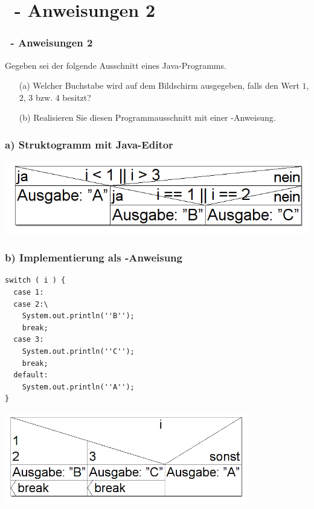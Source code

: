\def\stitle{\theexercise\ - Anweisungen 2}
\section{\stitle}
\begin{frame}[t]%
    \frametitle{\stitle}
\medskip

Gegeben sei der folgende Ausschnitt eines Java-Programms.


\begin{itemize}
\item[(a)] Welcher Buchstabe wird auf dem Bildschirm ausgegeben, falls  den Wert $1$, $2$, $3$ bzw. $4$ besitzt?
\item[(b)] Realisieren Sie diesen Programmausschnitt mit einer -Anweisung.
\end{itemize}
\end{frame}


\begin{frame}[fragile]%
 \frametitle{a) Struktogramm mit Java-Editor}%

\begin{center}

\includegraphics[width=1\textwidth]{anweis-2/Bilder/Struktogramm_a}
\end{center}
\end{frame}


\begin{frame}[fragile]%
 \frametitle{b) Implementierung als -Anweisung}%

\begin{center}
\begin{minipage}{0.7\textwidth}
\begin{lstlisting}
switch ( i ) {
  case 1:
  case 2:\
    System.out.println(''B'');
    break;
  case 3:
    System.out.println(''C'');
    break;
  default:
    System.out.println(''A'');
}
\end{lstlisting}

\end{minipage}
\medskip

\includegraphics[width=0.8\textwidth]{anweis-2/Bilder/Struktogramm_b}
\end{center}

\end{frame}
